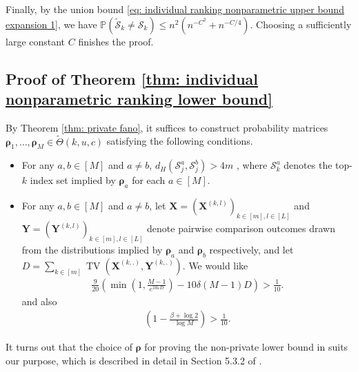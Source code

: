 \documentclass[letterpaper,12pt]{article}
\numberwithin{equation}{section}
\theoremstyle{plain}
\numberwithin{Theorem}{section}
\numberwithin{corollary}{section}
\numberwithin{proposition}{section}
\numberwithin{Lemma}{section}
{
	\theoremstyle{definition}
	\newtheorem{Definition}{Definition}
	\newtheorem{example}{Example}
	\numberwithin{example}{section}
	\newtheorem{fact}{Fact}
	\numberwithin{fact}{section}
	\newtheorem{remark}{Remark}
}
\newcommand{\Pro}{\mathbb{P}}
\newcommand{\1}{\mathbbm{1}}
\begin{document}
Finally, by the union bound \eqref{eq: individual ranking nonparametric upper bound expansion 1}, we have $\Pro(\tilde {\mathcal S}_k \neq \mathcal S_k) \leq n^2(n^{-C^2} + n^{-C/4})$. Choosing a sufficiently large constant $C$ finishes the proof.



\subsection{Proof of Theorem \ref{thm: individual nonparametric ranking lower bound}}
\label{sec: proof of thm: individual nonparametric ranking lower bound}

By Theorem \ref{thm: private fano}, it suffices to construct probability matrices $\bm \rho_1, \ldots, \bm \rho_M \in \widetilde \Theta(k, u, c)$ satisfying the following conditions.
\begin{itemize}
	\item For any $a, b \in [M]$ and $a \neq b$, $d_H(\mathcal S^a_j, \mathcal S^b_j) > 4m$ , where $\mathcal S^a_k$ denotes the top-$k$ index set implied by $\bm \rho_a$ for each $a \in [M]$.
	\item For any $a, b \in [M]$ and $a \neq b$, let $\bm X = \left(\bm X^{(k,l)}\right)_{k\in[m], l \in [L]}$ and $\bm Y = \left(\bm Y^{(k,l)}\right)_{k \in[m], l\in [L]}$ denote pairwise comparison outcomes drawn from the distributions implied by $\bm \rho_a$ and $\bm \rho_b$ respectively, and let $D = \sum_{k \in [m]} \operatorname{TV}(\bm X^{(k,.)}, \bm Y^{(k,.)})$. We would like
	\begin{align}\label{eq: individual condition for expected hamming distance}
		\frac{9}{20}\left(\min\left(1, \frac{M-1}{e^{10\varepsilon D}}\right) - 10\delta(M-1)D\right) > \frac{1}{10}.
	\end{align} 
	and also
	\begin{align}\label{eq: condition for non private part}
		\left(1-\frac{\beta+\log2}{\log M}\right) > \frac{1}{10}.
	\end{align}	
\end{itemize}
It turns out that the choice of $\bm \rho$ for proving the non-private lower bound in \cite{shah2017simple} suits our purpose, which is described in detail in Section 5.3.2 of \cite{shah2017simple}. 
\end{document}

